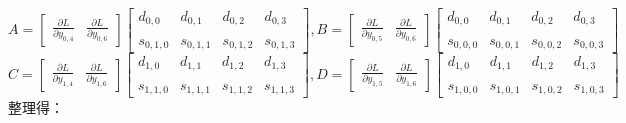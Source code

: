 \documentclass{article}
\begin{document}
$$
A=
\begin{bmatrix}
    \frac{\partial L}{\partial y_{0,4}} & \frac{\partial L}{\partial y_{0,6}}
\end{bmatrix}
\begin{bmatrix}
    d_{0,0} & d_{0,1} & d_{0,2} & d_{0,3} \\\\
    s_{0,1,0} & s_{0,1,1} & s_{0,1,2} & s_{0,1,3}
\end{bmatrix}
,
B=
\begin{bmatrix}
    \frac{\partial L}{\partial y_{0,5}} & \frac{\partial L}{\partial y_{0,6}}
\end{bmatrix}
\begin{bmatrix}
    d_{0,0} & d_{0,1} & d_{0,2} & d_{0,3} \\\\
    s_{0,0,0} & s_{0,0,1} & s_{0,0,2} & s_{0,0,3}
\end{bmatrix}
$$
$$
C=
\begin{bmatrix}
    \frac{\partial L}{\partial y_{1,4}} & \frac{\partial L}{\partial y_{1,6}}
\end{bmatrix}
\begin{bmatrix}
    d_{1,0} & d_{1,1} & d_{1,2} & d_{1,3} \\\\
    s_{1,1,0} & s_{1,1,1} & s_{1,1,2} & s_{1,1,3}
\end{bmatrix}
,
D=
\begin{bmatrix}
    \frac{\partial L}{\partial y_{1,5}} & \frac{\partial L}{\partial y_{1,6}}
\end{bmatrix}
\begin{bmatrix}
    d_{1,0} & d_{1,1} & d_{1,2} & d_{1,3} \\\\
    s_{1,0,0} & s_{1,0,1} & s_{1,0,2} & s_{1,0,3}
\end{bmatrix}
$$
整理得：
\end{document}
